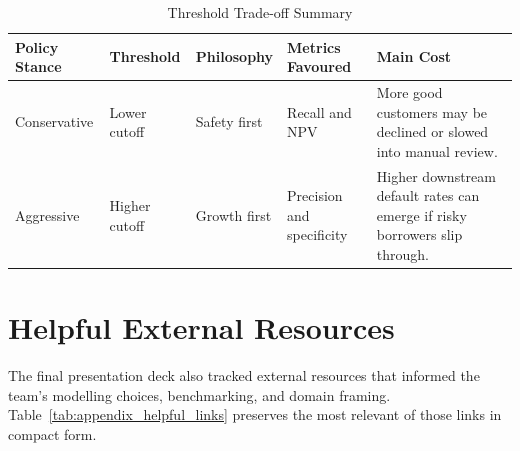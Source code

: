 \begin{table}[H]
\centering
\caption{Threshold Trade-off Summary}
\label{tab:appendix_tradeoff_summary}
\begin{tabular}{p{2.8cm}p{2.5cm}p{2.7cm}p{3.2cm}p{3.8cm}}
\toprule
\textbf{Policy Stance} & \textbf{Threshold} & \textbf{Philosophy} & \textbf{Metrics Favoured} & \textbf{Main Cost} \\
\midrule
Conservative & Lower cutoff & Safety first & Recall and \ac{NPV} & More good customers may be declined or slowed into manual review. \\
Aggressive & Higher cutoff & Growth first & Precision and specificity & Higher downstream default rates can emerge if risky borrowers slip through. \\
\bottomrule
\end{tabular}
\end{table}

\FloatBarrier

\section{Helpful External Resources}

The final presentation deck also tracked external resources that informed the team's modelling choices, benchmarking, and domain framing. Table~\ref{tab:appendix_helpful_links} preserves the most relevant of those links in compact form.

